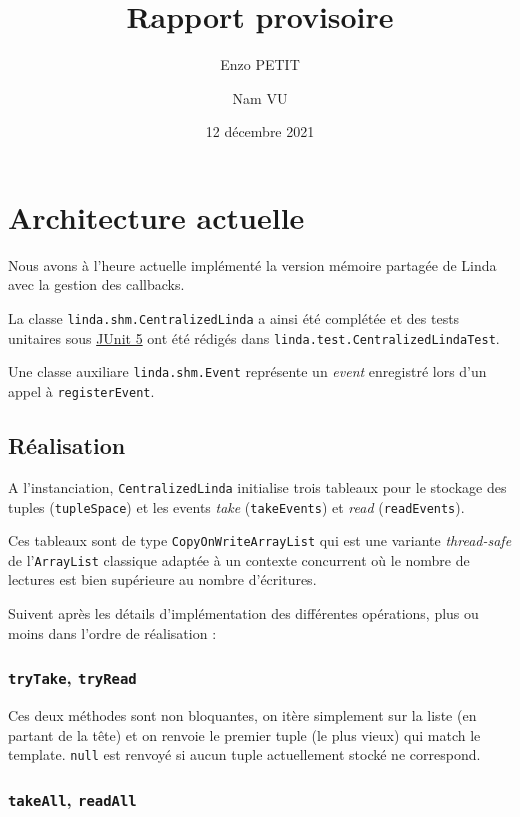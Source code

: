 \documentclass[headings=standardclasses,parskip=half]{scrartcl}
\title{Rapport provisoire}
\subtitle{}
\author{Enzo PETIT \and Nam VU}
\date{12 décembre 2021}
\begin{document}
\maketitle

\section*{Architecture actuelle}

Nous avons à l'heure actuelle implémenté la version mémoire partagée
de Linda avec la gestion des callbacks.

La classe \texttt{linda.shm.CentralizedLinda} a ainsi été complétée et
des tests unitaires sous \href{https://junit.org/junit5/}{JUnit 5}
ont été rédigés dans \texttt{linda.test.CentralizedLindaTest}.

Une classe auxiliare \texttt{linda.shm.Event} représente un
\emph{event} enregistré lors d'un appel à \texttt{registerEvent}.

\subsection*{Réalisation}

A l'instanciation, \texttt{CentralizedLinda} initialise trois tableaux
pour le stockage des tuples (\texttt{tupleSpace}) et les events
\emph{take} (\texttt{takeEvents}) et \emph{read} (\texttt{readEvents}).

Ces tableaux sont de type \texttt{CopyOnWriteArrayList} qui est une
variante \emph{thread-safe} de l'\texttt{ArrayList} classique adaptée
à un contexte concurrent où le nombre de lectures est bien supérieure
au nombre d'écritures.

Suivent après les détails d'implémentation des différentes opérations,
plus ou moins dans l'ordre de réalisation :

\subsubsection*{\texttt{tryTake}, \texttt{tryRead}}

Ces deux méthodes sont non bloquantes, on itère simplement sur la liste
(en partant de la tête) et on renvoie le premier tuple (le plus vieux)
qui match le template. \texttt{null} est renvoyé si aucun tuple
actuellement stocké ne correspond.

\subsubsection*{\texttt{takeAll}, \texttt{readAll}}
\end{document}
